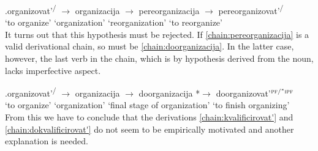 \exg.\label{chain:pereorganizacija}organizovat'\textsuperscript{\PF\slash\IPF} {$\rightarrow$} organizacija {$\rightarrow$} pereorganizacija {$\rightarrow$} {pereorganizovat'\textsuperscript{\PF\slash\IPF}}\\
{`to organize'} {} `organization' {} `reorganization' {} {`to reorganize'}\\

It turns out that this hypothesis must be rejected. If \ref{chain:pereorganizacija} is a valid derivational chain, so must be \ref{chain:doorganizacija}. In the latter case, however, the last verb in the chain, which is by hypothesis derived from the noun, lacks imperfective aspect. 

\exg.\label{chain:doorganizacija}organizovat'\textsuperscript{\PF\slash\IPF} {$\rightarrow$} organizacija {$\rightarrow$} doorganizacija {*$\rightarrow$} {doorganizovat'$^{{\textsc{pf}}/^*{\textsc{ipf}}}$}\\
{`to organize'} {} `organization' {} {`final stage of organization'} {} {`to finish organizing'}\\

From this we have to conclude that the derivations \ref{chain:kvalificirovat'} and \ref{chain:dokvalificirovat'} do not seem to be empirically motivated and another explanation is needed. 


